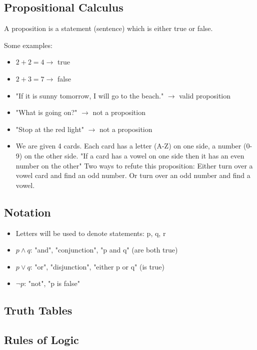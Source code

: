 \documentclass[9pt, letterpaper, oneside]{article}
\begin{document}
\subsection{Propositional Calculus}

A proposition is a statement (sentence) which is either true or false.

Some examples:
\begin{itemize}
	\item $2 + 2 = 4 \to$ true
	\item $2+3 = 7 \to$ false
	\item "If it is sunny tomorrow, I will go to the beach." $\to$ valid proposition
	\item "What is going on?" $\to$ not a proposition
	\item "Stop at the red light" $\to$ not a proposition
	\item We are given 4 cards. Each card has a letter (A-Z) on one side, a number (0-9) on the other side. "If a card has a vowel on one side then it has an even number on the other" Two ways to refute this proposition: Either turn over a vowel card and find an odd number. Or turn over an odd number and find a vowel.
\end{itemize}

\subsection{Notation}
\begin{itemize}
	\item Letters will be used to denote statements: p, q, r
	\item $p \wedge q$: "and", "conjunction", "p and q" (are both true)
	\item $p \vee q$: "or", "disjunction", "either p or q" (is true)
	\item $\neg p$: "not", "p is false"	
\end{itemize}

\subsection{Truth Tables}

\subsection{Rules of Logic}
\end{document}
